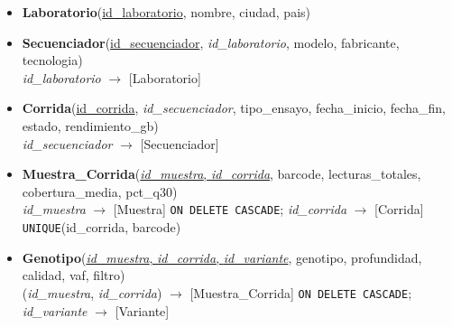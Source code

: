 \documentclass[11pt,a4paper]{article}
\newcommand{\pk}[1]{\underline{#1}}
\newcommand{\fk}[1]{\textit{#1}}
\newcommand{\tb}[1]{\texttt{#1}}
\begin{document}
\begin{itemize}[leftmargin=1.2em, itemsep=0.4em]
        \fk{id\_muestra} $\rightarrow$ [Muestra] \tb{ON DELETE CASCADE}
  \item \textbf{Laboratorio}(\pk{id\_laboratorio}, nombre, ciudad, pais)
  \item \textbf{Secuenciador}(\pk{id\_secuenciador}, \fk{id\_laboratorio}, modelo, fabricante, tecnologia)\\
        \fk{id\_laboratorio} $\rightarrow$ [Laboratorio]
  \item \textbf{Corrida}(\pk{id\_corrida}, \fk{id\_secuenciador}, tipo\_ensayo, fecha\_inicio, fecha\_fin, estado, rendimiento\_gb)\\
        \fk{id\_secuenciador} $\rightarrow$ [Secuenciador]
  \item \textbf{Muestra\_Corrida}(\pk{\fk{id\_muestra}, \fk{id\_corrida}}, barcode, lecturas\_totales, cobertura\_media, pct\_q30)\\
        \fk{id\_muestra} $\rightarrow$ [Muestra] \tb{ON DELETE CASCADE}; \quad \fk{id\_corrida} $\rightarrow$ [Corrida]\\ \tb{UNIQUE}(id\_corrida, barcode)
  \item \textbf{Genotipo}(\pk{\fk{id\_muestra}, \fk{id\_corrida}, \fk{id\_variante}}, genotipo, profundidad, calidad, vaf, filtro)\\
        (\fk{id\_muestra}, \fk{id\_corrida}) $\rightarrow$ [Muestra\_Corrida] \tb{ON DELETE CASCADE}; \quad \fk{id\_variante} $\rightarrow$ [Variante]
\end{itemize}
\end{document}
